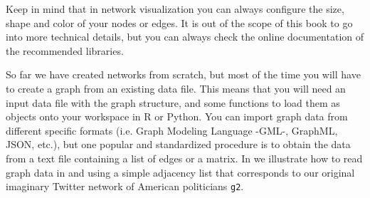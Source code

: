 
Keep in mind that in network visualization you can always configure the size, shape and color of your nodes or edges. It is out of the scope of this book to go into more technical details, but you can always check the online documentation of the recommended libraries.

So far we have created networks from scratch, but most of the time you will have to create a graph from an existing data file. This means that you will need an input data file with the graph structure, and some functions to load them as objects onto your workspace in R or Python. You can import graph data from different specific formats (i.e. Graph Modeling Language -GML-, GraphML, JSON, etc.), but one popular and standardized procedure is to obtain the data from a text file containing a list of edges or a matrix. In   we illustrate how to read graph data in  and  using a simple adjacency list that corresponds to our original imaginary Twitter network of American politicians \texttt{g2}.

